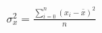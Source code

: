 \documentclass[10pt]{article}
\begin{document}
\begin{align*}\sigma_{x}^{2} =\frac{ {\sum\limits_{i=0}^n} (x_i - \bar{x})^2}{n}\end{align*}
\end{document}
